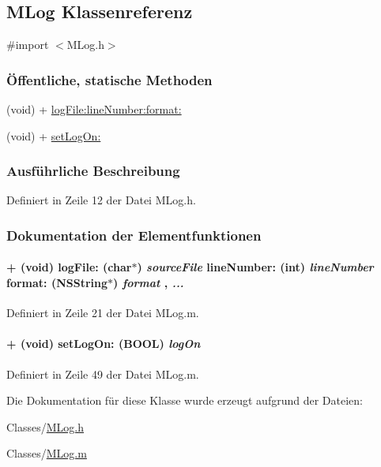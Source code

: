 \hypertarget{interface_m_log}{
\subsection{MLog Klassenreferenz}
\label{interface_m_log}
}


{\ttfamily \#import $<$MLog.h$>$}\subsubsection*{Öffentliche, statische Methoden}
\begin{DoxyCompactItemize}
\item 
(void) + \hyperlink{interface_m_log_a71bacb57900885f71ff36f77fd845342}{logFile:lineNumber:format:}
\item 
(void) + \hyperlink{interface_m_log_ae721dccba2d0197fee0b98fd38001d36}{setLogOn:}
\end{DoxyCompactItemize}


\subsubsection{Ausführliche Beschreibung}


Definiert in Zeile 12 der Datei MLog.h.

\subsubsection{Dokumentation der Elementfunktionen}
\hypertarget{interface_m_log_a71bacb57900885f71ff36f77fd845342}{
\paragraph[{logFile:lineNumber:format:}]{\setlength{\rightskip}{0pt plus 5cm}+ (void) logFile: (char$\ast$) {\em sourceFile}\/ lineNumber: (int) {\em lineNumber}\/ format: (NSString$\ast$) {\em format}\/ ,  {\em ...}}\hfill}
\label{interface_m_log_a71bacb57900885f71ff36f77fd845342}


Definiert in Zeile 21 der Datei MLog.m.\hypertarget{interface_m_log_ae721dccba2d0197fee0b98fd38001d36}{
\paragraph[{setLogOn:}]{\setlength{\rightskip}{0pt plus 5cm}+ (void) setLogOn: (BOOL) {\em logOn}}\hfill}
\label{interface_m_log_ae721dccba2d0197fee0b98fd38001d36}


Definiert in Zeile 49 der Datei MLog.m.

Die Dokumentation für diese Klasse wurde erzeugt aufgrund der Dateien:\begin{DoxyCompactItemize}
\item 
Classes/\hyperlink{_m_log_8h}{MLog.h}\item 
Classes/\hyperlink{_m_log_8m}{MLog.m}\end{DoxyCompactItemize}

